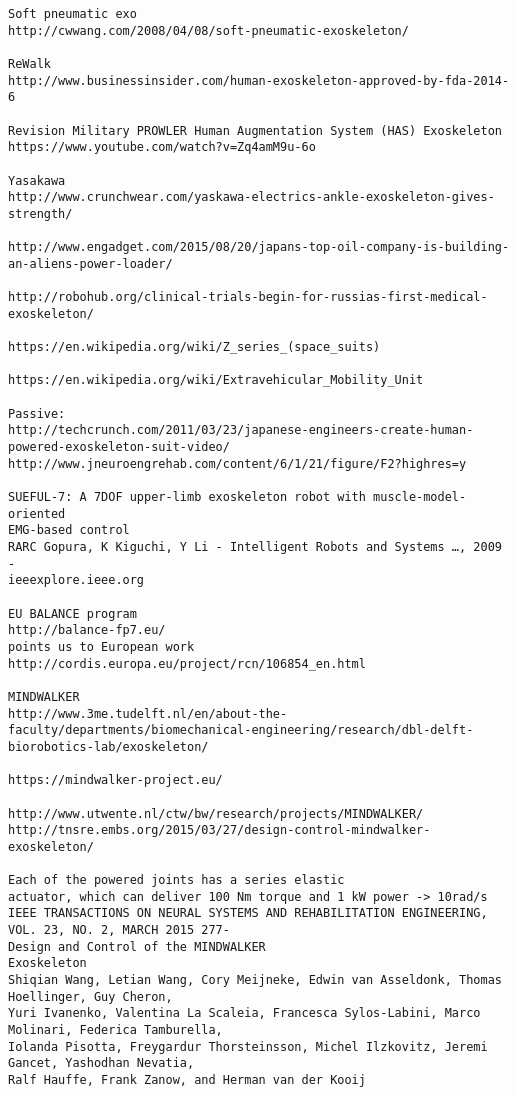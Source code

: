 \documentclass[letterpaper,12pt,fullpage]{article}
\begin{document}
\begin{verbatim}
Soft pneumatic exo
http://cwwang.com/2008/04/08/soft-pneumatic-exoskeleton/

ReWalk
http://www.businessinsider.com/human-exoskeleton-approved-by-fda-2014-6

Revision Military PROWLER Human Augmentation System (HAS) Exoskeleton
https://www.youtube.com/watch?v=Zq4amM9u-6o

Yasakawa
http://www.crunchwear.com/yaskawa-electrics-ankle-exoskeleton-gives-strength/

http://www.engadget.com/2015/08/20/japans-top-oil-company-is-building-an-aliens-power-loader/

http://robohub.org/clinical-trials-begin-for-russias-first-medical-exoskeleton/

https://en.wikipedia.org/wiki/Z_series_(space_suits)

https://en.wikipedia.org/wiki/Extravehicular_Mobility_Unit

Passive:
http://techcrunch.com/2011/03/23/japanese-engineers-create-human-powered-exoskeleton-suit-video/
http://www.jneuroengrehab.com/content/6/1/21/figure/F2?highres=y

SUEFUL-7: A 7DOF upper-limb exoskeleton robot with muscle-model-oriented
EMG-based control
RARC Gopura, K Kiguchi, Y Li - Intelligent Robots and Systems …, 2009 -
ieeexplore.ieee.org

EU BALANCE program
http://balance-fp7.eu/
points us to European work
http://cordis.europa.eu/project/rcn/106854_en.html

MINDWALKER
http://www.3me.tudelft.nl/en/about-the-faculty/departments/biomechanical-engineering/research/dbl-delft-biorobotics-lab/exoskeleton/

https://mindwalker-project.eu/

http://www.utwente.nl/ctw/bw/research/projects/MINDWALKER/
http://tnsre.embs.org/2015/03/27/design-control-mindwalker-exoskeleton/

Each of the powered joints has a series elastic
actuator, which can deliver 100 Nm torque and 1 kW power -> 10rad/s
IEEE TRANSACTIONS ON NEURAL SYSTEMS AND REHABILITATION ENGINEERING, VOL. 23, NO. 2, MARCH 2015 277-
Design and Control of the MINDWALKER
Exoskeleton
Shiqian Wang, Letian Wang, Cory Meijneke, Edwin van Asseldonk, Thomas Hoellinger, Guy Cheron,
Yuri Ivanenko, Valentina La Scaleia, Francesca Sylos-Labini, Marco Molinari, Federica Tamburella,
Iolanda Pisotta, Freygardur Thorsteinsson, Michel Ilzkovitz, Jeremi Gancet, Yashodhan Nevatia,
Ralf Hauffe, Frank Zanow, and Herman van der Kooij



\end{verbatim}
\end{document}
